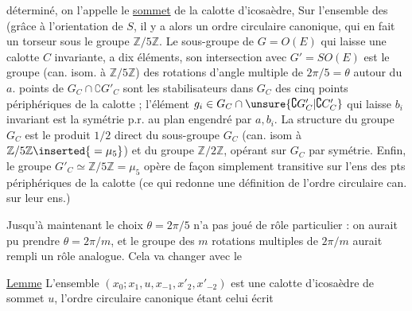 déterminé,  on l'appelle le \uline{sommet} de la calotte d'icosaèdre,   Sur l'ensemble des   (grâce à l'orientation  de $S$,  il y a alors un ordre circulaire canonique, qui en fait un torseur sous le groupe $\mathbb Z/5\mathbb Z$. Le sous-groupe  de $G=O(E)$ qui laisse une calotte $C$ invariante,  a dix éléments,  son intersection  avec $G'=SO(E)$ est le groupe (can. isom. à $\mathbb Z/5\mathbb Z$) des rotations d'angle multiple de $2\pi/5=\theta$ autour du   $a$.   points de $G_C\cap\complement G'_C$ sont  les stabilisateurs dans $G_C$ des cinq points périphériques de la calotte ; l'élément $g_i\in G_C\cap\unsure{\complement G'_C|\complement C'_C}$ qui laisse $b_i$ invariant est la symétrie p.r. au plan engendré par $a,b_i$. La structure du groupe $G_C$ est le produit $1/2$ direct du  sous-groupe $G_C$ (can. isom à $\mathbb Z/5\mathbb Z\inserted{{}=\mu_5}$) et du groupe $\mathbb Z/2\mathbb Z$, opérant sur $G_C$ par symétrie. Enfin, le groupe $G'_C\simeq\mathbb Z/5\mathbb Z=\mu_5$ opère de façon simplement transitive sur l'ens des pts périphériques de la calotte (ce qui redonne une définition de  l'ordre circulaire can. sur leur ens.)

Jusqu'à maintenant le choix $\theta=2\pi/5$ n'a pas joué de rôle particulier : on aurait pu prendre $\theta=2\pi/m$, et le groupe des $m$ rotations multiples de $2\pi/m$ aurait rempli un rôle analogue. Cela va changer avec le

\uline{Lemme} L'ensemble $(x_0;x_1,u,x_{-1},x'_2,x'_{-2})$ est une calotte d'icosaèdre de sommet $u$, l'ordre circulaire canonique étant celui écrit

